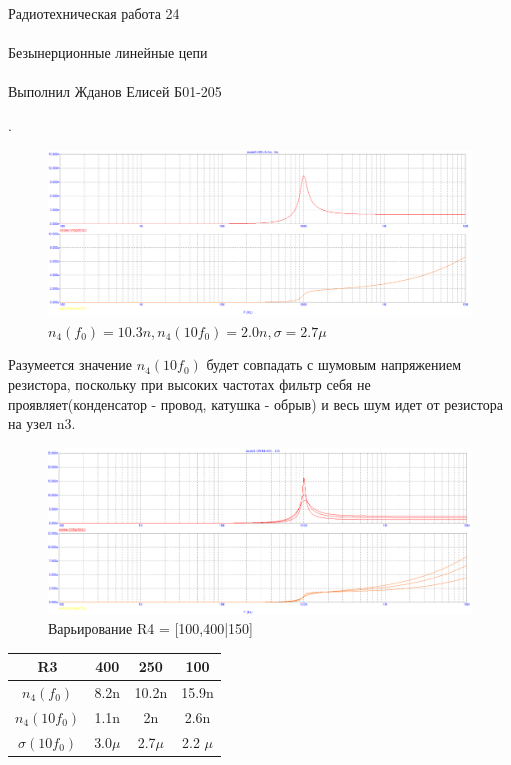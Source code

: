 \documentclass{astroedu-lab}
\begin{document}
\begin{problem}{\huge Радиотехническая работа 24\\\\Безынерционные линейные цепи\\\\Выполнил Жданов Елисей Б01-205}
\begin{enumerate}
.

\begin{figure}[h!]
    \centering
    \includegraphics[scale=0.3]{images/mod3_4_1.png}
    \caption{$n_4(f_0) = 10.3n, n_4(10 f_0) = 2.0n, \sigma = 2.7\mu$}
    \label{fig:m341}
\end{figure}

Разумеется значение $n_4(10 f_0)$ будет совпадать с шумовым напряжением резистора, поскольку при высоких частотах фильтр себя не проявляет(конденсатор - провод, катушка - обрыв) и весь шум идет от резистора на узел n3.

\begin{figure}[h!]
    \centering
    \includegraphics[scale=0.3]{images/mod3_4_2_1.png}
    \caption{Варьирование R4 = [100,400|150]}
    \label{fig:m3421}
\end{figure}

\begin{center}
\begin{tabular}{|c|c|c|c|}
\hline
    R3 & 400 & 250 & 100\\ \hline
    $n_4(f_0)$ & 8.2n & 10.2n & 15.9n\\ \hline
    $n_4(10 f_0)$ & 1.1n & 2n & 2.6n\\ \hline
    $\sigma(10 f_0)$ & 3.0$\mu$ & 2.7$\mu$ & 2.2 $\mu$ \\ \hline
\end{tabular}
\end{center}

\newpage


\end{enumerate}
\end{problem}
\end{document}
